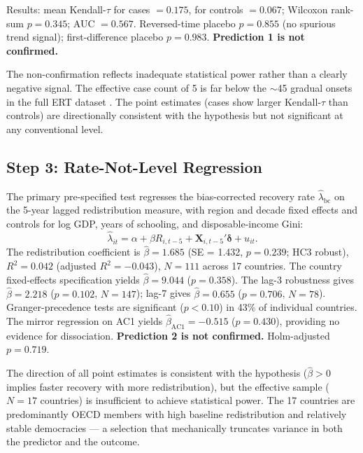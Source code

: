 \documentclass[11pt,letterpaper]{article}
\begin{document}
Results: mean Kendall-$\tau$ for cases $= 0.175$, for controls $= 0.067$; Wilcoxon rank-sum $p = 0.345$;
AUC $= 0.567$. Reversed-time placebo $p = 0.855$ (no spurious trend signal); first-difference placebo $p = 0.983$.
\textbf{Prediction 1 is not confirmed.}

The non-confirmation reflects inadequate statistical power rather than a clearly negative signal. The effective case
count of 5 is far below the $\sim$45 gradual onsets in the full ERT dataset \citep{Maerz2024}. The point estimates
(cases show larger Kendall-$\tau$ than controls) are directionally consistent with the hypothesis but not significant at
any conventional level.

\subsection{Step 3: Rate-Not-Level Regression}

The primary pre-specified test regresses the bias-corrected recovery rate $\hat{\lambda}_{\text{bc}}$ on the 5-year
lagged redistribution measure, with region and decade fixed effects and controls for log GDP, years of schooling, and
disposable-income Gini:
\begin{equation}
  \hat{\lambda}_{it} = \alpha + \beta R_{i,t-5} + \mathbf{X}_{i,t-5}'\boldsymbol{\delta} + u_{it}.
  \label{eq:regression}
\end{equation}
The redistribution coefficient is $\hat{\beta} = 1.685$ (SE = 1.432, $p = 0.239$; HC3 robust),
$R^2 = 0.042$ (adjusted $R^2 = -0.043$), $N = 111$ across 17 countries. The country fixed-effects specification
yields $\hat{\beta} = 9.044$ ($p = 0.358$). The lag-3 robustness gives $\hat{\beta} = 2.218$ ($p = 0.102$,
$N = 147$); lag-7 gives $\hat{\beta} = 0.655$ ($p = 0.706$, $N = 78$). Granger-precedence tests are significant
($p < 0.10$) in 43\% of individual countries. The mirror regression on AC1 yields
$\hat{\beta}_\text{AC1} = -0.515$ ($p = 0.430$), providing no evidence for dissociation.
\textbf{Prediction 2 is not confirmed.} Holm-adjusted $p = 0.719$.

The direction of all point estimates is consistent with the hypothesis ($\hat{\beta} > 0$ implies faster recovery with
more redistribution), but the effective sample ($N = 17$ countries) is insufficient to achieve statistical power. The 17
countries are predominantly OECD members with high baseline redistribution and relatively stable democracies --- a
selection that mechanically truncates variance in both the predictor and the outcome.
\end{document}
